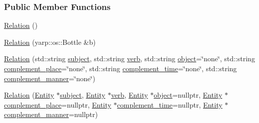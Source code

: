 \subsubsection*{Public Member Functions}
\begin{DoxyCompactItemize}
\item 
\hyperlink{group__icubclient__representations_ad534358d219c6bd37103261b8c73ca28}{Relation} ()
\item 
\hyperlink{group__icubclient__representations_a87209b6621a3a92e9a839cbf1874e102}{Relation} (yarp\+::os\+::\+Bottle \&b)
\item 
\hyperlink{group__icubclient__representations_abd844358bc71826a1a6bf50d66a283bb}{Relation} (std\+::string \hyperlink{group__icubclient__representations_a7001a61802fd1292a54b20ab4bb2565e}{subject}, std\+::string \hyperlink{group__icubclient__representations_ad20612000c6327a4ee6cb1f7568ccefa}{verb}, std\+::string \hyperlink{group__icubclient__representations_a701b6174e22c50ce091c321faca34df3}{object}=\char`\"{}none\char`\"{}, std\+::string \hyperlink{group__icubclient__representations_a8a4d20108d73ff505c8cadfaeb902c98}{complement\+\_\+place}=\char`\"{}none\char`\"{}, std\+::string \hyperlink{group__icubclient__representations_a2aa21779ce00775fc5a937e9cfc9bce0}{complement\+\_\+time}=\char`\"{}none\char`\"{}, std\+::string \hyperlink{group__icubclient__representations_afefea8d3d76cee06eeb88dcd04e4d39e}{complement\+\_\+manner}=\char`\"{}none\char`\"{})
\item 
\hyperlink{group__icubclient__representations_a896d0c420059a0a133d4a8cdb3d7b8f6}{Relation} (\hyperlink{group__icubclient__representations_classicubclient_1_1Entity}{Entity} $\ast$\hyperlink{group__icubclient__representations_a7001a61802fd1292a54b20ab4bb2565e}{subject}, \hyperlink{group__icubclient__representations_classicubclient_1_1Entity}{Entity} $\ast$\hyperlink{group__icubclient__representations_ad20612000c6327a4ee6cb1f7568ccefa}{verb}, \hyperlink{group__icubclient__representations_classicubclient_1_1Entity}{Entity} $\ast$\hyperlink{group__icubclient__representations_a701b6174e22c50ce091c321faca34df3}{object}=nullptr, \hyperlink{group__icubclient__representations_classicubclient_1_1Entity}{Entity} $\ast$\hyperlink{group__icubclient__representations_a8a4d20108d73ff505c8cadfaeb902c98}{complement\+\_\+place}=nullptr, \hyperlink{group__icubclient__representations_classicubclient_1_1Entity}{Entity} $\ast$\hyperlink{group__icubclient__representations_a2aa21779ce00775fc5a937e9cfc9bce0}{complement\+\_\+time}=nullptr, \hyperlink{group__icubclient__representations_classicubclient_1_1Entity}{Entity} $\ast$\hyperlink{group__icubclient__representations_afefea8d3d76cee06eeb88dcd04e4d39e}{complement\+\_\+manner}=nullptr)

\end{DoxyCompactItemize}
